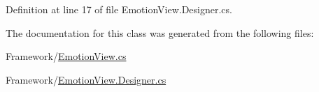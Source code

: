 Definition at line 17 of file Emotion\+View.\+Designer.\+cs.



The documentation for this class was generated from the following files\+:\begin{DoxyCompactItemize}
\item 
Framework/\hyperlink{_emotion_view_8cs}{Emotion\+View.\+cs}\item 
Framework/\hyperlink{_emotion_view_8_designer_8cs}{Emotion\+View.\+Designer.\+cs}\end{DoxyCompactItemize}
